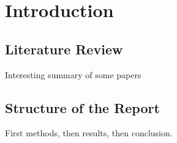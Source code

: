 \chapter{Introduction}

\section{Literature Review}

Interesting summary of some papers
\section{Structure of the Report}

First methods, then results, then conclusion.












